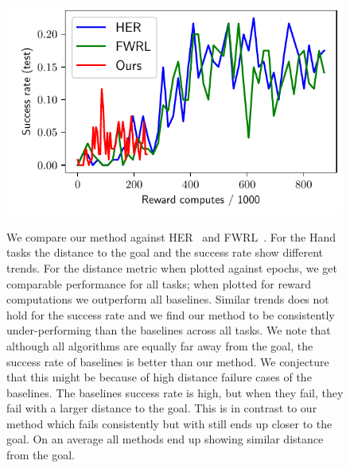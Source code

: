 \begin{figure}
  \includegraphics[width=\frac\columnwidth]{media/res/6efc1de-path_reward_low_thresh_chosen-HandManipulatePenRotate-v0-ddpg/reward_computes-test/success_rate.pdf}
  \label{fig:path-reward-hand}%
  \caption{We compare our method against HER~\citep{andrychowicz2016learning}
    and FWRL~\citep{dhiman2018floydwarshall}.
For the Hand tasks the distance to the goal and the success rate show different trends.
For the distance metric when plotted against epochs, we get comparable
performance for all tasks; when plotted for reward computations we outperform
all baselines.
Similar trends does not hold for the success rate and we find our method to be
consistently under-performing than the baselines across all tasks. We note that
although all algorithms are equally far away from the goal, the success rate of
baselines is better than our method. We conjecture that this might be because of
high distance failure cases of the baselines. The baselines success rate is
high, but when they fail, they fail with a larger distance to the goal. This is
in contrast to our method which fails consistently but with still ends up closer
to the goal. On an average all methods end up showing similar distance from the goal.
}%
\end{figure}%
% 